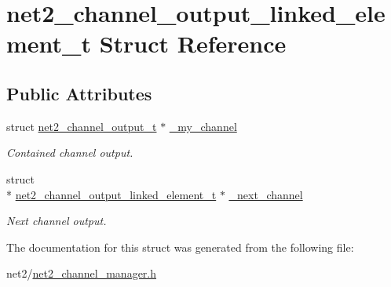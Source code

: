 \hypertarget{structnet2__channel__output__linked__element__t}{\section{net2\-\_\-channel\-\_\-output\-\_\-linked\-\_\-element\-\_\-t Struct Reference}
\label{structnet2__channel__output__linked__element__t}
}
\subsection*{Public Attributes}
\begin{DoxyCompactItemize}
\item 
\hypertarget{structnet2__channel__output__linked__element__t_a343a53b3f9c63bb64b2d478421aae3cf}{struct \hyperlink{structnet2__channel__output__t}{net2\-\_\-channel\-\_\-output\-\_\-t} $\ast$ \hyperlink{structnet2__channel__output__linked__element__t_a343a53b3f9c63bb64b2d478421aae3cf}{\-\_\-my\-\_\-channel}}\label{structnet2__channel__output__linked__element__t_a343a53b3f9c63bb64b2d478421aae3cf}

\begin{DoxyCompactList}\small\item\em Contained channel output. \end{DoxyCompactList}\item 
\hypertarget{structnet2__channel__output__linked__element__t_a433cc35e25167e850e0d04c222b75a44}{struct \\*
\hyperlink{structnet2__channel__output__linked__element__t}{net2\-\_\-channel\-\_\-output\-\_\-linked\-\_\-element\-\_\-t} $\ast$ \hyperlink{structnet2__channel__output__linked__element__t_a433cc35e25167e850e0d04c222b75a44}{\-\_\-next\-\_\-channel}}\label{structnet2__channel__output__linked__element__t_a433cc35e25167e850e0d04c222b75a44}

\begin{DoxyCompactList}\small\item\em Next channel output. \end{DoxyCompactList}\end{DoxyCompactItemize}


The documentation for this struct was generated from the following file\-:\begin{DoxyCompactItemize}
\item 
net2/\hyperlink{net2__channel__manager_8h}{net2\-\_\-channel\-\_\-manager.\-h}\end{DoxyCompactItemize}
